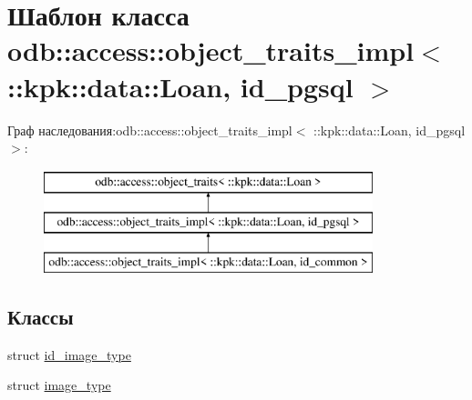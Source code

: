 \hypertarget{classodb_1_1access_1_1object__traits__impl_3_01_1_1kpk_1_1data_1_1_loan_00_01id__pgsql_01_4}{}\section{Шаблон класса odb\+:\+:access\+:\+:object\+\_\+traits\+\_\+impl$<$ \+:\+:kpk\+:\+:data\+:\+:Loan, id\+\_\+pgsql $>$}
\label{classodb_1_1access_1_1object__traits__impl_3_01_1_1kpk_1_1data_1_1_loan_00_01id__pgsql_01_4}
Граф наследования\+:odb\+:\+:access\+:\+:object\+\_\+traits\+\_\+impl$<$ \+:\+:kpk\+:\+:data\+:\+:Loan, id\+\_\+pgsql $>$\+:\begin{figure}[H]
\begin{center}
\leavevmode
\includegraphics[height=3.000000cm]{classodb_1_1access_1_1object__traits__impl_3_01_1_1kpk_1_1data_1_1_loan_00_01id__pgsql_01_4}
\end{center}
\end{figure}
\subsection*{Классы}
\begin{DoxyCompactItemize}
\item 
struct \hyperlink{structodb_1_1access_1_1object__traits__impl_3_01_1_1kpk_1_1data_1_1_loan_00_01id__pgsql_01_4_1_1id__image__type}{id\+\_\+image\+\_\+type}
\item 
struct \hyperlink{structodb_1_1access_1_1object__traits__impl_3_01_1_1kpk_1_1data_1_1_loan_00_01id__pgsql_01_4_1_1image__type}{image\+\_\+type}
\end{DoxyCompactItemize}
